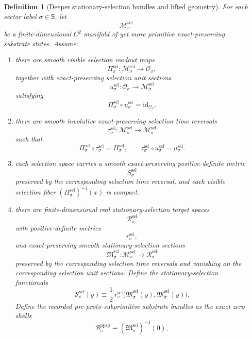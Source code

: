 \documentclass[11pt]{article}
\newcommand{\SectorSet}{\mathsf S}
\newcommand{\ObjClass}[1]{\mathcal O_{#1}}
\newcommand{\PreProtoSubprimSpace}[1]{\mathcal B_{#1}^{\mathrm{ppsp}}}
\newcommand{\SelSpace}[1]{\mathcal M_{#1}^{\mathrm{sel}}}
\newcommand{\SelRead}[1]{\Pi_{#1}^{\mathrm{sel}}}
\newcommand{\SelUnit}[1]{u_{#1}^{\mathrm{sel}}}
\newcommand{\SelTimeRev}[1]{\tau_{#1}^{\mathrm{sel}}}
\newcommand{\SelMetric}[1]{S_{#1}^{\mathrm{sel}}}
\newcommand{\SelTarget}[1]{\mathcal R_{#1}^{\mathrm{sel}}}
\newcommand{\SelTargetMetric}[1]{r_{#1}^{\mathrm{sel}}}
\newcommand{\SelSection}[1]{\mathfrak M_{#1}^{\mathrm{sel}}}
\newcommand{\SelFunctional}[1]{\mathscr S_{#1}^{\mathrm{sel}}}
\newtheorem{definition}{Definition}
\begin{document}
\begin{definition}[Deeper stationary-selection bundles and lifted geometry]
\label{def:selection_geometry}
For each sector label \(\sigma\in\SectorSet\), let
\[
\SelSpace{\sigma}
\]
be a finite-dimensional \(C^2\) manifold of yet more primitive exact-preserving substrate states. Assume:
\begin{enumerate}
    \item there are smooth visible selection readout maps
    \[
    \SelRead{\sigma}:\SelSpace{\sigma}\to\ObjClass{\sigma},
    \]
    together with exact-preserving selection unit sections
    \[
    \SelUnit{\sigma}:\ObjClass{\sigma}\to\SelSpace{\sigma}
    \]
    satisfying
    \[
    \SelRead{\sigma}\circ\SelUnit{\sigma}=\mathrm{id}_{\ObjClass{\sigma}}.
    \]
    \item there are smooth involutive exact-preserving selection time reversals
    \[
    \SelTimeRev{\sigma}:\SelSpace{\sigma}\to\SelSpace{\sigma}
    \]
    such that
    \[
    \SelRead{\sigma}\circ\SelTimeRev{\sigma}=\SelRead{\sigma},
    \qquad
    \SelTimeRev{\sigma}\circ\SelUnit{\sigma}=\SelUnit{\sigma}.
    \]
    \item each selection space carries a smooth exact-preserving positive-definite metric
    \[
    \SelMetric{\sigma}
    \]
    preserved by the corresponding selection time reversal, and each visible selection fiber \((\SelRead{\sigma})^{-1}(x)\) is compact.
    \item there are finite-dimensional real stationary-selection target spaces
    \[
    \SelTarget{\sigma}
    \]
    with positive-definite metrics
    \[
    \SelTargetMetric{\sigma},
    \]
    and exact-preserving smooth stationary-selection sections
    \[
    \SelSection{\sigma}:\SelSpace{\sigma}\to\SelTarget{\sigma}
    \]
    preserved by the corresponding selection time reversals and vanishing on the corresponding selection unit sections. Define the stationary-selection functionals
    \begin{equation}
    \SelFunctional{\sigma}(y)\equiv \frac12\,
    \SelTargetMetric{\sigma}\bigl(\SelSection{\sigma}(y),\SelSection{\sigma}(y)\bigr).
    \label{eq:selection_functional}
    \end{equation}
    Define the recorded pre-proto-subprimitive substrate bundles as the exact zero shells
    \begin{equation}
    \PreProtoSubprimSpace{\sigma}\equiv \left(\SelSection{\sigma}\right)^{-1}(0),
    \label{eq:preproto_shell_from_selection}
    \end{equation}

\end{enumerate}
\end{definition}
\end{document}
